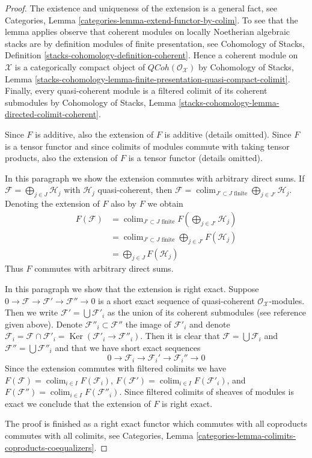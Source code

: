\documentclass[10pt,a4paper]{amsart}
\theoremstyle{plain}
\theoremstyle{definition}
\theoremstyle{remark}
\numberwithin{equation}{subsection}
\def\colim{\mathop{\mathrm{colim}}\nolimits}
\def\QCoh{\mathit{QCoh}}
\def\Ker{\mathop{\mathrm{Ker}}}
\begin{document}
\begin{proof}
The existence and uniqueness of the extension is a general fact, see
Categories, Lemma \ref{categories-lemma-extend-functor-by-colim}.
To see that the lemma applies observe that coherent modules on
locally Noetherian algebraic stacks are by definition modules
of finite presentation, see
Cohomology of Stacks, Definition \ref{stacks-cohomology-definition-coherent}.
Hence a coherent module on $\mathcal{X}$ is a
categorically compact object of $\QCoh(\mathcal{O}_\mathcal{X})$ by
Cohomology of Stacks, Lemma
\ref{stacks-cohomology-lemma-finite-presentation-quasi-compact-colimit}.
Finally, every quasi-coherent module is a filtered colimit of
its coherent submodules by Cohomology of Stacks, Lemma
\ref{stacks-cohomology-lemma-directed-colimit-coherent}.

\medskip\noindent
Since $F$ is additive, also the extension of $F$ is additive (details omitted).
Since $F$ is a tensor functor and since colimits of modules
commute with taking tensor products, also the extension of $F$
is a tensor functor (details omitted).

\medskip\noindent
In this paragraph we show the extension commutes with arbitrary
direct sums. If $\mathcal{F} = \bigoplus_{j \in J} \mathcal{H}_j$
with $\mathcal{H}_j$ quasi-coherent, then
$\mathcal{F} = \colim_{J' \subset J\text{ finite}}
\bigoplus_{j \in J'} \mathcal{H}_j$.
Denoting the extension of $F$ also by $F$ we obtain
\begin{align*}
F(\mathcal{F})
& =
\colim_{J' \subset J\text{ finite}}
F(\bigoplus\nolimits_{j \in J'} \mathcal{H}_j) \\
& =
\colim_{J' \subset J\text{ finite}}
\bigoplus\nolimits_{j \in J'} F(\mathcal{H}_j) \\
& =
\bigoplus\nolimits_{j \in J} F(\mathcal{H}_j)
\end{align*}
Thus $F$ commutes with arbitrary direct sums.

\medskip\noindent
In this paragraph we show that the extension is right exact.
Suppose $0 \to \mathcal{F} \to \mathcal{F}' \to \mathcal{F}'' \to 0$
is a short exact sequence of quasi-coherent $\mathcal{O}_\mathcal{X}$-modules.
Then we write $\mathcal{F}' = \bigcup \mathcal{F}'_i$ as the
union of its coherent submodules (see reference given above).
Denote $\mathcal{F}''_i \subset \mathcal{F}''$ the image of $\mathcal{F}'_i$
and denote $\mathcal{F}_i = \mathcal{F} \cap \mathcal{F}'_i =
\Ker(\mathcal{F}'_i \to \mathcal{F}''_i)$. Then it is clear that
$\mathcal{F} = \bigcup \mathcal{F}_i$ and
$\mathcal{F}'' = \bigcup \mathcal{F}''_i$
and that we have short exact sequences
$$
0 \to \mathcal{F}_i \to \mathcal{F}_i' \to \mathcal{F}_i'' \to 0
$$
Since the extension commutes with filtered colimits we have
$F(\mathcal{F}) = \colim_{i \in I} F(\mathcal{F}_i)$,
$F(\mathcal{F}') = \colim_{i \in I} F(\mathcal{F}'_i)$, and
$F(\mathcal{F}'') = \colim_{i \in I} F(\mathcal{F}''_i)$.
Since filtered colimits of sheaves of modules is exact we
conclude that the extension of $F$ is right exact.

\medskip\noindent
The proof is finished as a right exact functor which commutes with all
coproducts commutes with all colimits, see
Categories, Lemma \ref{categories-lemma-colimits-coproducts-coequalizers}.
\end{proof}
\end{document}
